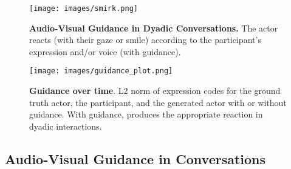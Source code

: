 















\begin{figure}[t]
  \centering
   \texttt{[image: images/smirk.png]}
   \caption{\textbf{Audio-Visual Guidance in Dyadic Conversations.} The actor reacts (with their gaze or smile) according to the participant's expression and/or voice (\MethodName with guidance).}
   \label{fig:qual_smirk}
   \vspace{-10pt}
\end{figure}



\begin{figure}[t]
  \centering
   \texttt{[image: images/guidance\_plot.png]}
   \caption{\textbf{Guidance over time}. L2 norm of expression codes for the ground truth actor, the participant, and the generated actor with or without guidance. With guidance, \MethodName produces the appropriate reaction in dyadic interactions.}
   \label{fig:plot_guidance}
   \vspace{-10pt}
\end{figure}

\subsection{Audio-Visual Guidance in Conversations}

